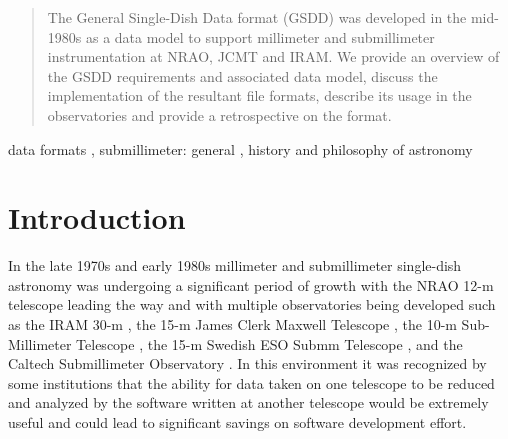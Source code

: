 \documentclass[final,authoryear,5p,times,twocolumn]{elsarticle}
\begin{document}
\begin{frontmatter}
\begin{abstract}

The General Single-Dish Data format (GSDD) was developed in the
mid-1980s as a data model to support millimeter and submillimeter
instrumentation at NRAO, JCMT and IRAM. We provide an overview of the GSDD
requirements and associated data model, discuss the implementation
of the resultant file formats, describe its usage in the observatories and
provide a retrospective on the format.

\end{abstract}

\begin{keyword}


data formats \sep
submillimeter: general \sep
history and philosophy of astronomy

\end{keyword}

\end{frontmatter}


\newcommand{\mnras}{MNRAS}
\newcommand{\aap}{A\&A}
\newcommand{\aaps}{A\&AS}
\newcommand{\pasp}{PASP}
\newcommand{\apj}{ApJ}
\newcommand{\apjs}{ApJS}
\newcommand{\qjras}{QJRAS}
\newcommand{\an}{Astron.\ Nach.}
\newcommand{\ijimw}{Int.\ J.\ Infrared \& Millimeter Waves}
\newcommand{\procspie}{Proc.\ SPIE}
\newcommand{\aspconf}{ASP Conf. Ser.}



\newcommand{\ascl}[1]{\href{http://www.ascl.net/#1}{ascl:#1}}


\section{Introduction}

In the late 1970s and early 1980s millimeter and submillimeter
single-dish astronomy was undergoing a significant period of growth \citep[see
e.g.,][]{2013ASSP...37...39R} with the NRAO 12-m telescope leading the
way \citep[see e.g.,][]{2005ASSL..323.....G} and with multiple
observatories being developed such as the IRAM 30-m
\citep{1981MitAG..54...61B}, the 15-m James Clerk Maxwell Telescope
\citep[JCMT;][]{1985ESOC...22...63H}, the 10-m Sub-Millimeter
Telescope \citep[SMT;][]{1985ESOC...22...71W}, the 15-m Swedish ESO
Submm Telescope \citep[SEST;][]{1985ESOC...22...25D}, and the Caltech
Submillimeter Observatory \citep[CSO;][]{1988BAAS...20..690P}. In this
environment it was recognized by some institutions that the ability
for data taken on one telescope to be reduced and analyzed by the
software written at another telescope would be extremely useful and
could lead to significant savings on software development effort.
\end{document}
